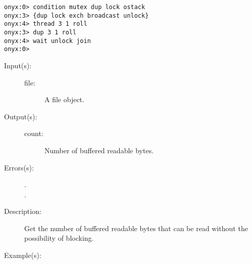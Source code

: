 \begin{description}
\begin{description}
\begin{verbatim}
onyx:0> condition mutex dup lock ostack
onyx:3> {dup lock exch broadcast unlock}
onyx:4> thread 3 1 roll
onyx:3> dup 3 1 roll
onyx:4> wait unlock join
onyx:0>
		\end{verbatim}
	\end{description}
\label{systemdict:bytesavailable}
\item[{\onyxop{file}{bytesavailable}{count}}: ]
	\begin{description}\item[]
	\item[Input(s): ]
		\begin{description}\item[]
		\item[file: ]
			A file object.
		\end{description}
	\item[Output(s): ]
		\begin{description}\item[]
		\item[count: ]
			Number of buffered readable bytes.
		\end{description}
	\item[Errors(s): ]
		\begin{description}\item[]
		\item[.]
		\item[.]
		\end{description}
	\item[Description: ]
		Get the number of buffered readable bytes that can be read
		without the possibility of blocking.
	\item[Example(s): ]\begin{verbatim}


\end{verbatim}
\end{description}
\end{description}
